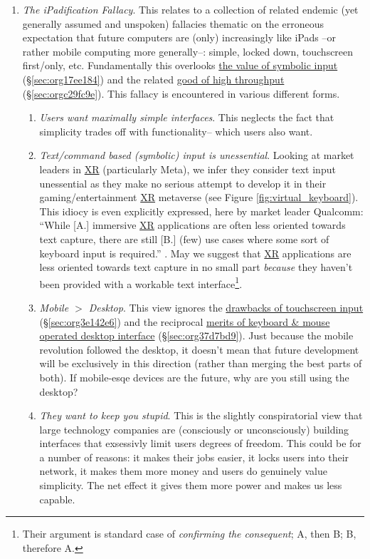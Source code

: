 \documentclass[logo,bsc,singlespacing,parskip]{infthesis}
\begin{document}
\begin{enumerate}
\item \emph{The iPadification Fallacy}.\label{ipadification fallacy}
This relates to a collection of related endemic (yet generally assumed and unspoken) fallacies thematic on the erroneous expectation that future computers are (only) increasingly like iPads --or rather mobile computing more generally--: simple, locked down, touchscreen first/only, etc.
Fundamentally this overlooks \hyperref[sec:org17ee184]{the value of symbolic input} (\S \ref{sec:org17ee184}) and the related \hyperref[sec:orgc29fc9e]{good of high throughput} (\S \ref{sec:orgc29fc9e}).
This fallacy is encountered in various different forms.
\begin{enumerate}
\item \emph{Users want maximally simple interfaces}.
This neglects the fact that simplicity trades off with functionality-- which users also want.
\item \emph{Text/command based (symbolic) input is unessential}.
Looking at market leaders in \hyperref[org53dbe83]{XR} (particularly Meta), we infer they consider text input unessential as they make no serious attempt to develop it in their gaming/entertainment \hyperref[org53dbe83]{XR} metaverse (see Figure \ref{fig:virtual_keyboard}).
This idiocy is even explicitly expressed, here by market leader Qualcomm: ``While [A.] immersive \hyperref[org53dbe83]{XR} applications are often less oriented towards text capture, there are still [B.] (few) use cases where some sort of keyboard input is required.'' \autocite{qualcommXRUserInterfaces}.
May we suggest that \hyperref[org53dbe83]{XR} applications are less oriented towards text capture in no small part \emph{because} they haven't been provided with a workable text interface\footnote{Their argument is standard case of \emph{confirming the consequent}; A, then B; B, therefore A.}.
\item \emph{Mobile \(>\) Desktop}.
This view ignores the \hyperref[sec:org3e142e6]{drawbacks of touchscreen input} (\S \ref{sec:org3e142e6}) and the reciprocal \hyperref[sec:org37d7bd9]{merits of keyboard \& mouse operated desktop interface} (\S \ref{sec:org37d7bd9}).
Just because the mobile revolution followed the desktop, it doesn't mean that future development will be exclusively in this direction (rather than merging the best parts of both).
If mobile-esqe devices are the future, why are you still using the desktop?
\item \emph{They want to keep you stupid}.
This is the slightly conspiratorial view that large technology companies are (consciously or unconsciously) building interfaces that exsessivly limit users degrees of freedom.
This could be for a number of reasons: it makes their jobs easier, it locks users into their network, it makes them more money and users do genuinely value simplicity.
The net effect it gives them more power and makes us less capable.
\end{enumerate}


\end{enumerate}
\end{document}
